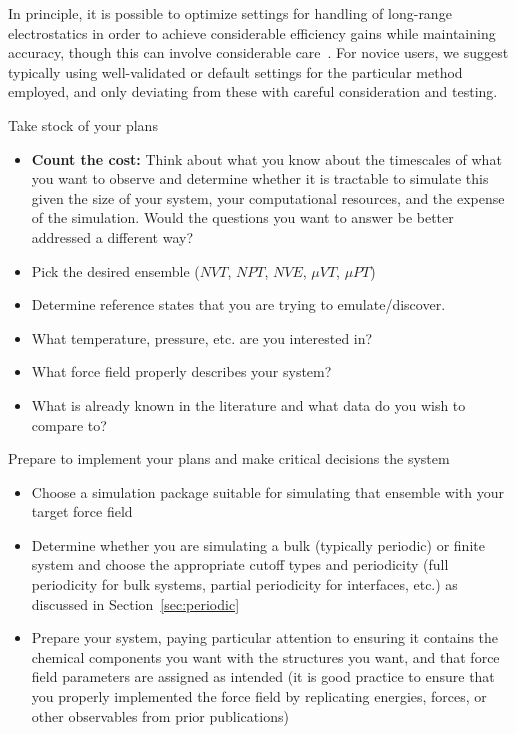 \documentclass[9pt,bestpractices]{livecoms}
\begin{document}
In principle, it is possible to optimize settings for handling of long-range electrostatics in order to achieve considerable efficiency gains while maintaining accuracy, though this can involve considerable care~\cite{Paliwal:2013:J.Chem.TheoryComput.}. 
For novice users, we suggest typically using well-validated or default settings for the particular method employed, and only deviating from these with careful consideration and testing.


\begin{Checklists*}[p!]

\begin{checklist}{Take stock of your plans}

\begin{itemize}
\item \textbf{Count the cost: } Think about what you know about the timescales of what you want to observe and determine whether it is tractable to simulate this given the size of your system, your computational resources, and the expense of the simulation. Would the questions you want to answer be better addressed a different way?
\item Pick the desired ensemble ($NVT$, $NPT$, $NVE$, $\mu VT$, $\mu PT$)
\item Determine reference states that you are trying to emulate/discover.
\item What temperature, pressure, etc. are you interested in?
\item What force field properly describes your system?
\item What is already known in the literature and what data do you wish to compare to?
\end{itemize}
\end{checklist}

\begin{checklist}{Prepare to implement your plans and make critical decisions the system}

\begin{itemize}
\item Choose a simulation package suitable for simulating that ensemble with your target force field
\item Determine whether you are simulating a bulk (typically periodic) or finite system and choose the appropriate cutoff types and periodicity (full periodicity for bulk systems, partial periodicity for interfaces, etc.) as discussed in Section~\ref{sec:periodic}
\item Prepare your system, paying particular attention to ensuring it contains the chemical components you want with the structures you want, and that force field parameters are assigned as intended (it is good practice to ensure that you properly implemented the force field by replicating energies, forces, or other observables from prior publications)
\end{itemize}
\end{checklist}


\end{Checklists*}
\end{document}
